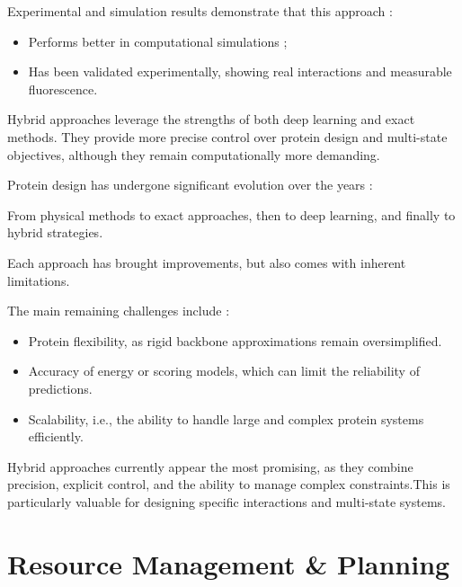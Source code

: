 \documentclass[a4paper]{article}
\begin{document}
Experimental and simulation results demonstrate that this approach :

\begin{itemize}
    \item Performs better in computational simulations ;
    \item Has been validated experimentally, showing real interactions and measurable fluorescence.
\end{itemize}


Hybrid approaches leverage the strengths of both deep learning and exact methods. They provide more precise control over protein design and multi-state objectives, although they remain computationally more demanding.
\newline
\newline


Protein design has undergone significant evolution over the years :

From physical methods to exact approaches, then to deep learning, and finally to hybrid strategies.

Each approach has brought improvements, but also comes with inherent limitations.

The main remaining challenges include :

\begin{itemize}
    \item Protein flexibility, as rigid backbone approximations remain oversimplified.
    \item Accuracy of energy or scoring models, which can limit the reliability of predictions.
    \item Scalability, i.e., the ability to handle large and complex protein systems efficiently.
\end{itemize}

Hybrid approaches currently appear the most promising, as they combine precision, explicit control, and the ability to manage complex constraints.This is particularly valuable for designing specific interactions and multi-state systems.


\clearpage
\section{Resource Management \& Planning}
\end{document}
